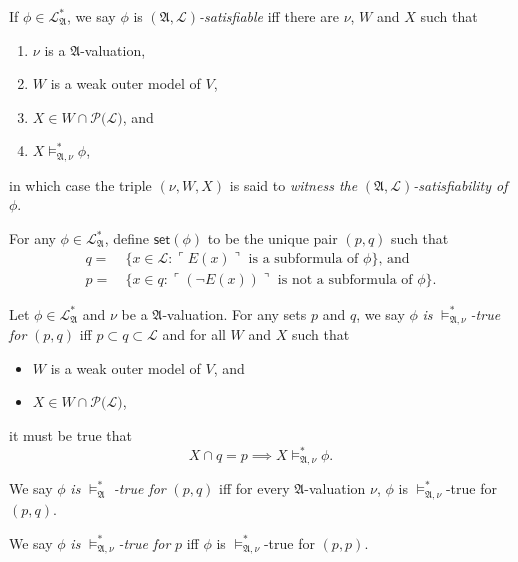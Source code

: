 \documentclass[12pt]{article}
\numberwithin{equation}{section}
\begin{document}
\begin{defi}
If $\phi \in \mathcal{L}^{*}_{\mathfrak{A}}$, we say $\phi$ is $(\mathfrak{A}, \mathcal{L})$\emph{-satisfiable} iff there are $\nu$, $W$ and $X$ such that
\begin{enumerate}[label=(\alph*)]
    \item $\nu$ is a $\mathfrak{A}$-valuation,
    \item $W$ is a weak outer model of $V$,
    \item $X \in W \cap \mathcal{P}(\mathcal{L)}$, and
    \item $X \models^*_{\mathfrak{A}, \nu} \phi$,
\end{enumerate}
in which case the triple $(\nu, W, X)$ is said to \emph{witness the} $(\mathfrak{A}, \mathcal{L})$\emph{-satisfiability of} $\phi$.
\end{defi}

\begin{defi}
For any $\phi \in \mathcal{L}^{*}_{\mathfrak{A}}$, define $\mathsf{set}(\phi)$ to be the unique pair $(p, q)$ such that
\begin{align*}
q = \ & \{x \in \mathcal{L} : \ulcorner E(x) \urcorner \text{ is a subformula of } \phi\} \text{, and} \\
p = \ & \{x \in q : \ulcorner (\neg E(x)) \urcorner \text{ is not a subformula of } \phi\} \text{.}
\end{align*}
\end{defi}

\begin{defi}
Let $\phi \in \mathcal{L}^{*}_{\mathfrak{A}}$ and $\nu$ be a $\mathfrak{A}$-valuation. For any sets $p$ and $q$, we say $\phi$ \emph{is} $\models^*_{\mathfrak{A}, \nu}$\emph{-true for} $(p, q)$ iff $p \subset q \subset \mathcal{L}$ and for all $W$ and $X$ such that
\begin{itemize}
    \item $W$ is a weak outer model of $V$, and
    \item $X \in W \cap \mathcal{P}(\mathcal{L)}$, 
\end{itemize}
it must be true that $$X \cap q = p \implies X \models^*_{\mathfrak{A}, \nu} \phi \text{.}$$

We say $\phi$ \emph{is} $\models^*_{\mathfrak{A}}$ \emph{-true for} $(p, q)$ iff for every $\mathfrak{A}$-valuation $\nu$, $\phi$ is $\models^*_{\mathfrak{A}, \nu}$-true for $(p, q)$.

We say $\phi$ \emph{is} $\models^*_{\mathfrak{A}, \nu}$\emph{-true for} $p$ iff $\phi$ is $\models^*_{\mathfrak{A}, \nu}$-true for $(p, p)$.
\end{defi}
\end{document}
